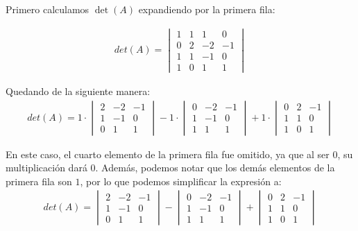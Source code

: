 \documentclass{article}
\begin{document}
Primero calculamos $\det(A)$ expandiendo por la primera fila:

\begin{align}
    det(A) = \begin{vmatrix}
    1 & 1 & 1 & 0 \\
    0 & 2 & -2 & -1 \\
    1 & 1 & -1 & 0 \\
    1 & 0 & 1 & 1
    \end{vmatrix}
\end{align}

Quedando de la siguiente manera:
\begin{align}
    det(A) = 1 \cdot \begin{vmatrix}
    2 & -2 & -1 \\
    1 & -1 & 0 \\
    0 & 1 & 1
    \end{vmatrix} - 1 \cdot \begin{vmatrix}
    0 & -2 & -1 \\
    1 & -1 & 0 \\
    1 & 1 & 1
    \end{vmatrix} + 1 \cdot \begin{vmatrix}
    0 & 2 & -1 \\
    1 & 1 & 0 \\
    1 & 0 & 1
    \end{vmatrix}
\end{align}

En este caso, el cuarto elemento de la primera fila fue omitido, ya que al ser $0$, su multiplicación dará $0$. Además, podemos notar que los demás elementos de la primera fila son $1$, por lo que podemos simplificar la expresión a: \\

\begin{align}
    det(A) = \begin{vmatrix}
    2 & -2 & -1 \\
    1 & -1 & 0 \\
    0 & 1 & 1
    \end{vmatrix} - \begin{vmatrix}
    0 & -2 & -1 \\
    1 & -1 & 0 \\
    1 & 1 & 1
    \end{vmatrix} + \begin{vmatrix}
    0 & 2 & -1 \\
    1 & 1 & 0 \\
    1 & 0 & 1
    \end{vmatrix}
\end{align}
\end{document}
